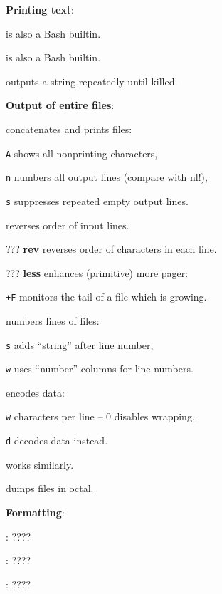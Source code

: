 \textbf{Printing text}:
\begin{compactenum}
	\item [\symbolcoreutils]  is also a Bash builtin.
	\item [\symbolcoreutils]  is also a Bash builtin.
	\item [\symbolcoreutils]  outputs a string repeatedly until killed.
\end{compactenum}

\textbf{Output of entire files}:
\begin{compactenum}
	\item [\symbolcoreutils]  concatenates and prints files:
	\item [\texttt{A}] shows all nonprinting characters,
	\item [\texttt{n}] numbers all output lines (compare with nl!),
	\item [\texttt{s}] suppresses repeated empty output lines.
	\item [\symbolcoreutils]  reverses order of input lines.
	\item [???] \textbf{rev} reverses order of characters in each line.
	\item [???] \textbf{less} enhances (primitive) more pager:
	\item [\texttt{+F}] monitors the tail of a file which is growing.
	\item [\symbolcoreutils]  numbers lines of files:
	\item [\texttt{s}] adds ``string'' after line number,
	\item [\texttt{w}] uses ``number'' columns for line numbers.
	\item [\symbolcoreutils]  encodes data:
	\item [\texttt{w}] characters per line -- 0 disables wrapping,
	\item [\texttt{d}] decodes data instead.
	\item [\symbolcoreutils]  works similarly.
	\item [\symbolcoreutils]  dumps files in octal.
\end{compactenum}

\textbf{Formatting}:
\begin{compactenum}
	\item [\symbolcoreutils] : \dotfill ????

	\item [\symbolcoreutils] : \dotfill ????

	\item [\symbolcoreutils] : \dotfill ????
\end{compactenum}

